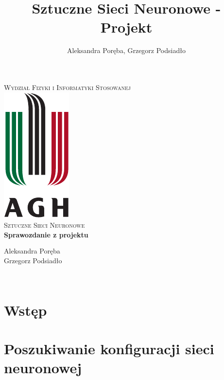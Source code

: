 \documentclass[12pt]{article}
\title{Sztuczne Sieci Neuronowe - Projekt}
\author{Aleksandra Poręba, Grzegorz Podsiadło}
\makeatletter
\let\thetitle\@title
\let\theauthor\@author
\makeatother
\begin{document}
\begin{center}
\textsc{\normalsize Wydział Fizyki i Informatyki Stosowanej}\\[2.0cm] 
\includegraphics[scale = 1]{logo.pdf}\\[1cm] 
\textsc{\Large Sztuczne Sieci Neuronowe}\\[0.4cm] 


{ \huge \bfseries \LARGE{Sprawozdanie z projektu} } 

\flushright \Large Aleksandra Poręba \\ Grzegorz Podsiadło

\vfill 

\center {\today}\\[2cm] 


\pagebreak 

\end{center}

\setcounter{tocdepth}{2}
\tableofcontents
\pagebreak


\pagestyle{fancy}
\fancyhf{}

\rhead{\theauthor}
\lhead{\thetitle}
\cfoot{\thepage}

\section{Wstęp}

\pagebreak
\section{Poszukiwanie konfiguracji sieci neuronowej}
\end{document}
